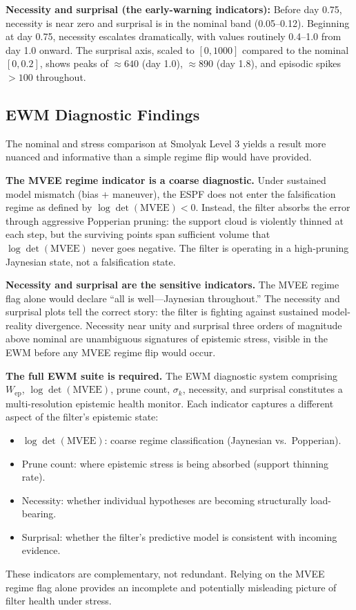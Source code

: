 \documentclass[12pt]{article}
\begin{document}
\textbf{Necessity and surprisal (the early-warning indicators):} Before day 0.75, necessity is near zero and surprisal is in the nominal band (0.05--0.12). Beginning at day 0.75, necessity escalates dramatically, with values routinely 0.4--1.0 from day 1.0 onward. The surprisal axis, scaled to $[0, 1000]$ compared to the nominal $[0, 0.2]$, shows peaks of $\approx 640$ (day 1.0), $\approx 890$ (day 1.8), and episodic spikes $> 100$ throughout.

\subsection{EWM Diagnostic Findings}
\label{sec:ewm_findings}

The nominal and stress comparison at Smolyak Level 3 yields a result more nuanced and informative than a simple regime flip would have provided.

\textbf{The MVEE regime indicator is a coarse diagnostic.} Under sustained model mismatch (bias + maneuver), the ESPF does not enter the falsification regime as defined by $\log\det(\mathrm{MVEE}) < 0$. Instead, the filter absorbs the error through aggressive Popperian pruning: the support cloud is violently thinned at each step, but the surviving points span sufficient volume that $\log\det(\mathrm{MVEE})$ never goes negative. The filter is operating in a high-pruning Jaynesian state, not a falsification state.

\textbf{Necessity and surprisal are the sensitive indicators.} The MVEE regime flag alone would declare ``all is well---Jaynesian throughout.'' The necessity and surprisal plots tell the correct story: the filter is fighting against sustained model-reality divergence. Necessity near unity and surprisal three orders of magnitude above nominal are unambiguous signatures of epistemic stress, visible in the EWM before any MVEE regime flip would occur.

\textbf{The full EWM suite is required.} The EWM diagnostic system comprising $W_\mathrm{ep}$, $\log\det(\mathrm{MVEE})$, prune count, $\sigma_k$, necessity, and surprisal constitutes a multi-resolution epistemic health monitor. Each indicator captures a different aspect of the filter's epistemic state:
\begin{itemize}
\item $\log\det(\mathrm{MVEE})$: coarse regime classification (Jaynesian vs.\ Popperian).
\item Prune count: where epistemic stress is being absorbed (support thinning rate).
\item Necessity: whether individual hypotheses are becoming structurally load-bearing.
\item Surprisal: whether the filter's predictive model is consistent with incoming evidence.
\end{itemize}
These indicators are complementary, not redundant. Relying on the MVEE regime flag alone provides an incomplete and potentially misleading picture of filter health under stress.
\end{document}
